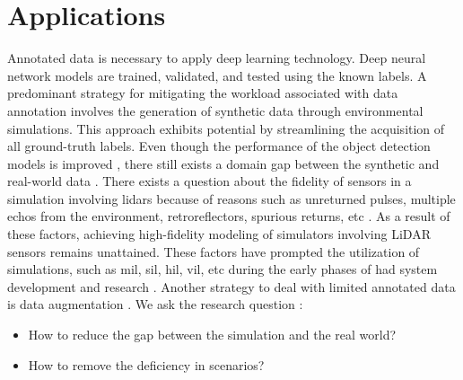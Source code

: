 \section{Applications}
Annotated data is necessary to apply deep learning technology. Deep neural network models are trained, validated, and tested using the known labels. A predominant strategy for mitigating the workload associated with data annotation involves the generation of synthetic data through environmental simulations. This approach exhibits potential by streamlining the acquisition of all ground-truth labels. Even though the performance of the object detection models is improved \parencite{johnsonroberson2017driving}, there still exists a domain gap between the synthetic and real-world data \parencite{care_real_and_syn_gap}. There exists a question about the fidelity of sensors in a simulation involving lidars because of reasons such as unreturned pulses, multiple echos from the environment, retroreflectors, spurious returns, etc \parencite{zero_domain_gap}. As a result of these factors, achieving high-fidelity modeling of simulators involving LiDAR sensors remains unattained. These factors have prompted the utilization of simulations, such as \acrfull{mil}, \acrfull{sil}, \acrfull{hil}, \acrfull{vil}, etc during the early phases of \acrshort{had} system development and research \parencite{x_in_loop}. Another strategy to deal with limited annotated data is data augmentation \parencite{lidar_aug}. We ask the research question : 
\begin{itemize}
    \item How to reduce the gap between the simulation and the real world?
    \item How to remove the deficiency in scenarios?
\end{itemize}


